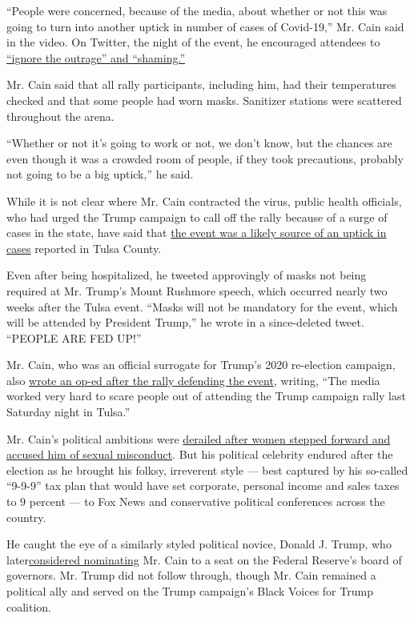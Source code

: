 ``People were concerned, because of the media, about whether or not this
was going to turn into another uptick in number of cases of Covid-19,''
Mr. Cain said in the video. On Twitter, the night of the event, he
encouraged attendees to
\href{https://twitter.com/THEHermanCain/status/1274438874253496320}{``ignore
the outrage'' and ``shaming.''}

Mr. Cain said that all rally participants, including him, had their
temperatures checked and that some people had worn masks. Sanitizer
stations were scattered throughout the arena.

``Whether or not it's going to work or not, we don't know, but the
chances are even though it was a crowded room of people, if they took
precautions, probably not going to be a big uptick,'' he said.

While it is not clear where Mr. Cain contracted the virus, public health
officials, who had urged the Trump campaign to call off the rally
because of a surge of cases in the state, have said that
\href{https://apnews.com/ad96548245e186382225818d8dc416eb}{the event was
a likely source of an uptick in cases} reported in Tulsa County.

Even after being hospitalized, he tweeted approvingly of masks not being
required at Mr. Trump's Mount Rushmore speech, which occurred nearly two
weeks after the Tulsa event. ``Masks will not be mandatory for the
event, which will be attended by President Trump,'' he wrote in a
since-deleted tweet. ``PEOPLE ARE FED UP!''

Mr. Cain, who was an official surrogate for Trump's 2020 re-election
campaign, also
\href{https://www.westernjournal.com/herman-cain-tulsa-trump-rally-crowd-huge-enthusiastic/}{wrote
an op-ed after the rally defending the event}, writing, ``The media
worked very hard to scare people out of attending the Trump campaign
rally last Saturday night in Tulsa.''

Mr. Cain's political ambitions were
\href{https://www.nytimes3xbfgragh.onion/2019/04/05/business/herman-cain-federal-reserve.html}{derailed
after women stepped forward and accused him of sexual misconduct}. But
his political celebrity endured after the election as he brought his
folksy, irreverent style --- best captured by his so-called ``9-9-9''
tax plan that would have set corporate, personal income and sales taxes
to 9 percent --- to Fox News and conservative political conferences
across the country.

He caught the eye of a similarly styled political novice, Donald J.
Trump, who
later\href{https://www.nytimes3xbfgragh.onion/2019/04/05/business/herman-cain-federal-reserve.html}{considered
nominating} Mr. Cain to a seat on the Federal Reserve's board of
governors. Mr. Trump did not follow through, though Mr. Cain remained a
political ally and served on the Trump campaign's Black Voices for Trump
coalition.

